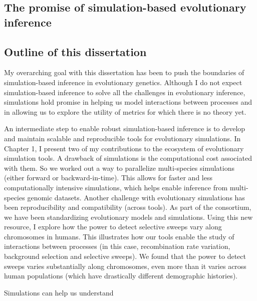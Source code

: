 \subsection{The promise of simulation-based evolutionary inference}





\subsection{Outline of this dissertation}

My overarching goal with this dissertation has been to push the boundaries of simulation-based inference in evolutionary genetics.
Although I do not expect simulation-based inference to solve all the challenges in evolutionary inference,
simulations hold promise in helping us model interactions between processes and in allowing us to explore the utility of metrics for which there is no theory yet.

An intermediate step to enable robust simulation-based inference is to develop and maintain scalable and reproducible tools for evolutionary simulations.
In Chapter 1, I present two of my contributions to the \tskit ecosystem of evolutionary simulation tools.
A drawback of simulations is the computational cost associated with them.
So we worked out a way to parallelize multi-species simulations (either forward or backward-in-time).
This allows for faster and less computationally intensive simulations, 
which helps enable inference from multi-species genomic datasets.
Another challenge with evolutionary simulations has been reproducibility and compatibility (across tools).
As part of the \stdpopsim consortium, we have been standardizing evolutionary models and simulations.
Using this new resource, I explore how the power to detect selective sweeps vary along chromosomes in humans.
This illustrates how our tools enable the study of interactions between processes (in this case, recombination rate variation, background selection and selective sweeps).
We found that the power to detect sweeps varies substantially along chromosomes, even more than it varies across human populations (which have drastically different demographic histories).


Simulations can help us understand 



